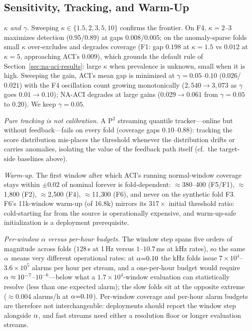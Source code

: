 \subsection{Sensitivity, Tracking, and Warm-Up}
\label{sec:sensitivity}
\emph{$\kappa$ and $\gamma$.} Sweeping $\kappa\in\{1.5,2,3,5,10\}$ confirms the frontier. On F4, $\kappa{=}2$--$3$ maximizes detection ($0.95$/$0.89$) at gaps $0.008$/$0.005$; on the anomaly-sparse folds small $\kappa$ over-excludes and degrades coverage (F1: gap $0.198$ at $\kappa{=}1.5$ vs $0.012$ at $\kappa{=}5$, approaching ACI's $0.009$), which grounds the default rule of Section~\ref{sec:na-aci-results}: large $\kappa$ when prevalence is unknown, small when it is high. Sweeping the gain, ACI's mean gap is minimized at $\gamma{=}0.05$--$0.10$ ($0.026$/$0.021$) with the F4 oscillation count growing monotonically ($2{,}540\to3{,}073$ as $\gamma$ goes $0.01\to0.10$); NA-ACI degrades at large gains ($0.029\to0.061$ from $\gamma{=}0.05$ to $0.20$). We keep $\gamma{=}0.05$.

\emph{Pure tracking is not calibration.} A P$^2$ streaming quantile tracker---online but without feedback---fails on every fold (coverage gaps $0.10$--$0.88$): tracking the score distribution mis-places the threshold whenever the distribution drifts or carries anomalies, isolating the value of the feedback path itself (cf.\ the target-side baselines above).

\emph{Warm-up.} The first window after which ACI's running normal-window coverage stays within $\pm0.02$ of nominal forever is fold-dependent: $\approx$380--400 (F5/F1), $\approx$1{,}800 (F2), $\approx$2{,}500 (F4), $\approx$11{,}300 (F6), and never on the synthetic fold F3. F6's 11k-window warm-up (of 16.8k) mirrors its $317\times$ initial threshold ratio: cold-starting far from the source is operationally expensive, and warm-up-safe initialization is a deployment prerequisite.

\emph{Per-window $\alpha$ versus per-hour budgets.} The window step spans five orders of magnitude across folds ($128$\,s at 1\,Hz versus $1$--$10.7$\,ms at kHz rates), so the same $\alpha$ means very different operational rates: at $\alpha{=}0.10$ the kHz folds issue $7\times10^4$--$3.6\times10^5$ alarms per hour per stream, and a one-per-hour budget would require $\alpha\approx10^{-7}$--$10^{-6}$---below what a $1.7\times10^4$-window evaluation can statistically resolve (less than one expected alarm); the slow folds sit at the opposite extreme ($\approx0.004$ alarms/h at $\alpha{=}0.10$). Per-window coverage and per-hour alarm budgets are therefore not interchangeable: deployments should report the window step alongside $\alpha$, and fast streams need either a resolution floor or longer evaluation streams.

